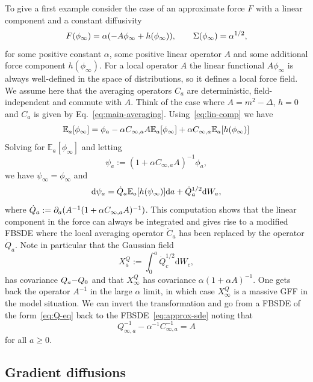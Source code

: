 \documentclass[reprint,aps]{revtex4-2}
\newcommand{\assign}{:=}
\newcommand{\mathd}{\mathrm{d}}
\newcommand{\tmcolor}[2]{{\color{#1}{#2}}}
\newcommand{\bbE}{\mathbb{E}}
\begin{document}
To give a first example consider the case of an approximate force $F$ with a
linear component and a constant diffusivity
\[ F (\phi_{\infty}) = \tmcolor{red}{\tmcolor{black}{\alpha}} (- A
   \phi_{\infty} + h (\phi_{\infty})), \qquad \Sigma (\phi_{\infty}) =
   \tmcolor{red}{\tmcolor{black}{\alpha^{1 / 2}}}, \]
for some positive constant $\alpha$, some positive linear operator $A$ and
some additional force component $h (\phi_{\infty})$. For a local operator $A$
the linear functional $A \phi_{\infty}$ is always well-defined in the space of
distributions, so it defines a local force field. We assume here that the
averaging operators $C_a$ are deterministic, field-independent and commute
with $A$. Think of the case where $A = m^2 - \Delta$, $h = 0$ and $C_a$ is
given by Eq.~\eqref{eq:main-averaging}. Using~\eqref{eq:lin-comp} we have
\[ \mathbb{E}_a [\phi_{\infty}] = \tmcolor{black}{\phi_a - \alpha C_{\infty,
   a} A\mathbb{E}_a [\phi_{\infty}] + \alpha C_{\infty, a} \mathbb{E}_a [h
   (\phi_{\infty})] } \]
Solving for $\mathbb{E}_a [\phi_{\infty}]$ and letting
\[ \psi_a \assign (1 + \alpha C_{\infty, a} A)^{- 1} \phi_a, \]
we have $\psi_{\infty} = \phi_{\infty}$ and
\begin{equation}
  \mathd \psi_a = \dot{Q}_a \bbE_a [h (\psi_{\infty})] \tmcolor{black}{\mathd
  a + \dot{Q}_a^{1 / 2}} \mathd W_a, \label{eq:Q-eq}
\end{equation}
where $\dot{Q}_a \assign \tmcolor{black}{\partial_a}  (A^{- 1} (1 + \alpha
C_{\infty, a} A)^{- 1})$. This computation shows that the linear component in
the force can always be integrated and gives rise to a modified FBSDE where
the local averaging operator $\dot{C}_a$ has been replaced by the operator
$\dot{Q}_a$. Note in particular that the Gaussian field
\begin{equation}
  X_a^Q \assign \int_0^a \dot{Q}_c^{1 / 2} \mathd W_c, \label{eq:GFF}
\end{equation}
has covariance $Q_a \tmcolor{black}{- Q_0}$ and that $X_{\infty}^Q$ has
covariance $\alpha (1 + \alpha A)^{- 1}$. One gets back the operator $A^{- 1}$
in the large $\alpha$ limit, in which case $X_{\infty}^Q$ is a massive GFF in
the model situation. We can invert the transformation and go from a FBSDE of
the form~\eqref{eq:Q-eq} back to the FBSDE~\eqref{eq:approx-sde} noting that
\[ Q_{\infty, a}^{- 1} - \alpha^{- 1} C_{\infty, a}^{- 1} = A \]
for all $a \geqslant 0$.

\subsection{Gradient diffusions}
\end{document}
